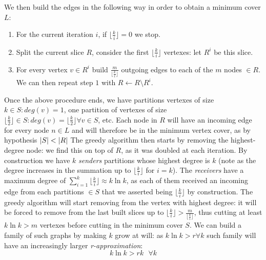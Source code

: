 We then build the edges in the following way in order to obtain a minimum cover $L$:
	\begin{enumerate}
	\item For the current iteration $i$, if $\lfloor{\frac{k}{i}}\rfloor = 0$ we stop.
	\item Split the current slice $R$, consider the first $\lfloor{\frac{k}{i}}\rfloor$ vertexes: let $R^i$ be this slice.
	\item For every vertex $v \in R^i$ build $\frac{m}{\lfloor{\frac{k}{i}}\rfloor}$ outgoing edges to each of the $m$ nodes $\in R$.
	We can then repeat step $1$ with $R \gets R \setminus R^i$.
	\end{enumerate}
Once the above procedure ends, we have partitions vertexes of size $k \in S: deg(v) = 1$, one partition of vertexes of size $\lfloor{\frac{k}{2}}\rfloor \in S: deg(v) = \lfloor{\frac{k}{2}}\rfloor \forall v \in S$, etc. 
Each node in $R$ will have an incoming edge for every node $n \in L$ and will therefore be in the minimum vertex cover, as by hypothesis $\lvert S\rvert < \lvert R\rvert$
The greedy algorithm then starts by removing the highest-degree node: we find this on top of $R$, as it was doubled at each iteration.
By construction we have $k$ \emph{senders} partitions whose highest degree is $k$ (note as the degree increases in the summation up to $\lfloor{\frac{k}{i}}\rfloor$ for $i = k$).
The \emph{receivers} have a maximum degree of $\sum_{i = 1}^{k} \lfloor{\frac{k}{i}}\rfloor \approx k \ln k$,
as each of them received an incoming edge from each partitions $\in S$ that we asserted being $\lfloor{\frac{k}{i}}\rfloor$ by construction.
The greedy algorithm will start removing from the vertex with highest degree: it will be forced to remove from the last built slices up to $\lfloor{\frac{k}{i}}\rfloor > \frac{m}{\lfloor{\frac{k}{i}}\rfloor}$, thus cutting at least $k \ln k > m$ vertexes before cutting in the minimum cover $S$.
We can build a family of such graphs by making $k$ grow at will: as $k \ln k > r \forall k$ such family will have an increasingly larger \emph{r-approximation}:
\begin{equation*}
  k \ln k > rk \text{ }\forall k
\end{equation*}